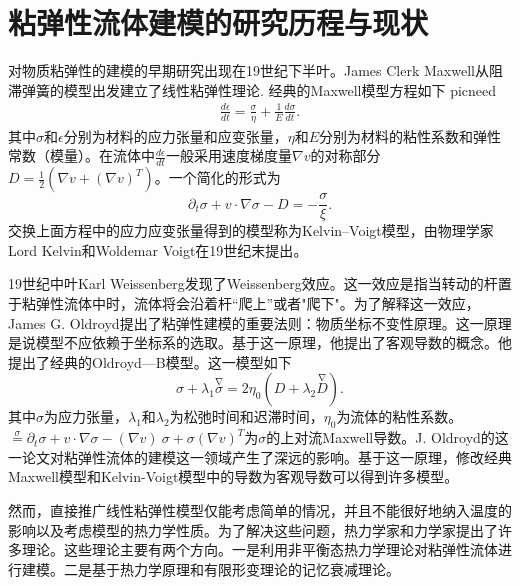 \documentclass{article}
\begin{document}
\section{粘弹性流体建模的研究历程与现状}
对物质粘弹性的建模的早期研究出现在19世纪下半叶。James Clerk Maxwell从阻滞弹簧的模型出发建立了线性粘弹性理论\cite{maxwell2013scientific}. 经典的Maxwell模型方程如下
picneed
\begin{eqnarray*}
\frac {d\epsilon} {dt} = \frac {\sigma} {\eta} + \frac {1} {E} \frac {d\sigma} {dt}.
\end{eqnarray*}
其中$\sigma$和$\epsilon$分别为材料的应力张量和应变张量，$\eta$和$E$分别为材料的粘性系数和弹性常数（模量）。在流体中$\frac {d\epsilon} {dt}$一般采用速度梯度量$\nabla v$的对称部分$D=\frac{1}{2} (\nabla v + (\nabla v)^T)$。一个简化的形式为
\begin{equation} \label{eq:maxwell}
			\partial_t \sigma + v \cdot \nabla \sigma - D = -\frac{\sigma}{\xi}. 
\end{equation}
交换上面方程中的应力应变张量得到的模型称为Kelvin–Voigt模型，由物理学家Lord Kelvin和Woldemar Voigt在19世纪末提出\cite{kelvin1887stability}。

19世纪中叶Karl Weissenberg发现了Weissenberg效应。这一效应是指当转动的杆置于粘弹性流体中时，流体将会沿着杆“爬上”或者"爬下"\cite{weissenberg1947continuum}。为了解释这一效应，James G. Oldroyd提出了粘弹性建模的重要法则：物质坐标不变性原理。这一原理是说模型不应依赖于坐标系的选取。基于这一原理，他提出了客观导数的概念。他提出了经典的Oldroyd—B模型。这一模型如下
\begin{equation} \label{eq：Oldroyd}
	{\sigma} + \lambda_1 \stackrel{\nabla}{{\sigma}} = 2\eta_0 ({D} + \lambda_2 \stackrel{\nabla}{{D}}).
\end{equation}
其中$\sigma$为应力张量，$\lambda_1$和$\lambda_2$为松弛时间和迟滞时间，$\eta_0$为流体的粘性系数。$\stackrel{\sigma} = \partial_t \sigma + v \cdot \nabla \sigma - (\nabla v)\  \sigma + \sigma (\nabla v)^T$为$\sigma$的上对流Maxwell导数\cite{oldroyd1950formulation}。J. Oldroyd的这一论文对粘弹性流体的建模这一领域产生了深远的影响。基于这一原理，修改经典Maxwell模型和Kelvin-Voigt模型中的导数为客观导数可以得到许多模型\cite{lin2005hydrodynamics,larson1999structure}。

然而，直接推广线性粘弹性模型仅能考虑简单的情况，并且不能很好地纳入温度的影响以及考虑模型的热力学性质。为了解决这些问题，热力学家和力学家提出了许多理论。这些理论主要有两个方向。一是利用非平衡态热力学理论对粘弹性流体进行建模\cite{jou1996extended,ottinger2005beyond,zhu2014conservation}。二是基于热力学原理和有限形变理论的记忆衰减理论\cite{coleman1961foundations,truesdell2012rational}。
\end{document}
